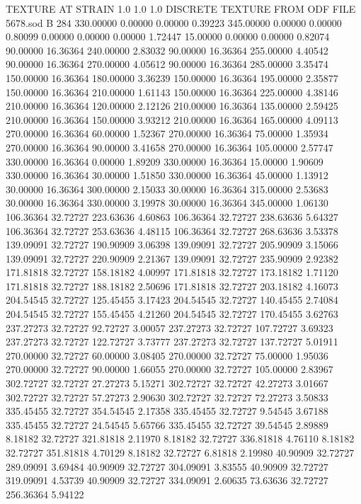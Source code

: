 TEXTURE AT STRAIN
   1.0   1.0   1.0
DISCRETE TEXTURE FROM ODF FILE  5678.sod                                
B    284
330.00000 0.00000 0.00000 0.39223
345.00000 0.00000 0.00000 0.80099
0.00000 0.00000 0.00000 1.72447
15.00000 0.00000 0.00000 0.82074
90.00000 16.36364 240.00000 2.83032
90.00000 16.36364 255.00000 4.40542
90.00000 16.36364 270.00000 4.05612
90.00000 16.36364 285.00000 3.35474
150.00000 16.36364 180.00000 3.36239
150.00000 16.36364 195.00000 2.35877
150.00000 16.36364 210.00000 1.61143
150.00000 16.36364 225.00000 4.38146
210.00000 16.36364 120.00000 2.12126
210.00000 16.36364 135.00000 2.59425
210.00000 16.36364 150.00000 3.93212
210.00000 16.36364 165.00000 4.09113
270.00000 16.36364 60.00000 1.52367
270.00000 16.36364 75.00000 1.35934
270.00000 16.36364 90.00000 3.41658
270.00000 16.36364 105.00000 2.57747
330.00000 16.36364 0.00000 1.89209
330.00000 16.36364 15.00000 1.90609
330.00000 16.36364 30.00000 1.51850
330.00000 16.36364 45.00000 1.13912
30.00000 16.36364 300.00000 2.15033
30.00000 16.36364 315.00000 2.53683
30.00000 16.36364 330.00000 3.19978
30.00000 16.36364 345.00000 1.06130
106.36364 32.72727 223.63636 4.60863
106.36364 32.72727 238.63636 5.64327
106.36364 32.72727 253.63636 4.48115
106.36364 32.72727 268.63636 3.53378
139.09091 32.72727 190.90909 3.06398
139.09091 32.72727 205.90909 3.15066
139.09091 32.72727 220.90909 2.21367
139.09091 32.72727 235.90909 2.92382
171.81818 32.72727 158.18182 4.00997
171.81818 32.72727 173.18182 1.71120
171.81818 32.72727 188.18182 2.50696
171.81818 32.72727 203.18182 4.16073
204.54545 32.72727 125.45455 3.17423
204.54545 32.72727 140.45455 2.74084
204.54545 32.72727 155.45455 4.21260
204.54545 32.72727 170.45455 3.62763
237.27273 32.72727 92.72727 3.00057
237.27273 32.72727 107.72727 3.69323
237.27273 32.72727 122.72727 3.73777
237.27273 32.72727 137.72727 5.01911
270.00000 32.72727 60.00000 3.08405
270.00000 32.72727 75.00000 1.95036
270.00000 32.72727 90.00000 1.66055
270.00000 32.72727 105.00000 2.83967
302.72727 32.72727 27.27273 5.15271
302.72727 32.72727 42.27273 3.01667
302.72727 32.72727 57.27273 2.90630
302.72727 32.72727 72.27273 3.50833
335.45455 32.72727 354.54545 2.17358
335.45455 32.72727 9.54545 3.67188
335.45455 32.72727 24.54545 5.65766
335.45455 32.72727 39.54545 2.89889
8.18182 32.72727 321.81818 2.11970
8.18182 32.72727 336.81818 4.76110
8.18182 32.72727 351.81818 4.70129
8.18182 32.72727 6.81818 2.19980
40.90909 32.72727 289.09091 3.69484
40.90909 32.72727 304.09091 3.83555
40.90909 32.72727 319.09091 4.53739
40.90909 32.72727 334.09091 2.60635
73.63636 32.72727 256.36364 5.94122
